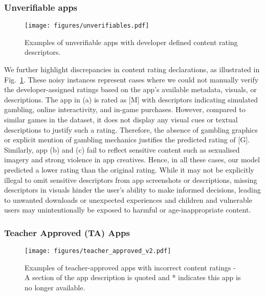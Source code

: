 \subsubsection{Unverifiable apps} 
\label{subsec: unverifiable_apps}

\begin{figure}[ht]  
    \centering
    \texttt{[image: figures/unverifiables.pdf]}
    \caption{Examples of unverifiable apps with developer defined content rating descriptors.}
    \label{fig:unverifiable_apps}
\end{figure}
We further highlight discrepancies in content rating declarations, as illustrated in Fig.~\ref{fig:unverifiable_apps}. These noisy instances represent cases where we could not manually verify the developer-assigned ratings based on the app’s available metadata, visuals, or descriptions. The app in (a) is rated as [M] with descriptors indicating simulated gambling, online interactivity, and in-game purchases. However, compared to similar games in the dataset, it does not display any visual cues or textual descriptions to justify such a rating. Therefore, the absence of gambling graphics or explicit mention of gambling mechanics justifies the predicted rating of [G].
Similarly, app (b) and (c) fail to reflect sensitive content such as sexualised imagery and strong violence in app creatives. Hence, in all these cases, our model predicted a lower rating than the original rating. While it may not be explicitly illegal to omit sensitive descriptors from app screenshots or descriptions, missing descriptors in visuals hinder the user's ability to make informed decisions, leading to unwanted downloads or unexpected experiences and children and vulnerable users may unintentionally be exposed to harmful or age-inappropriate content.


\subsubsection{Teacher Approved (TA) Apps}

\begin{figure}[ht]  
    \centering
    \texttt{[image: figures/teacher\_approved\_v2.pdf]}
    \caption{Examples of teacher-approved apps with incorrect content ratings - A section of the app description is quoted and * indicates this app is no longer available.}
    \label{fig:teacher_apps}
\end{figure}


